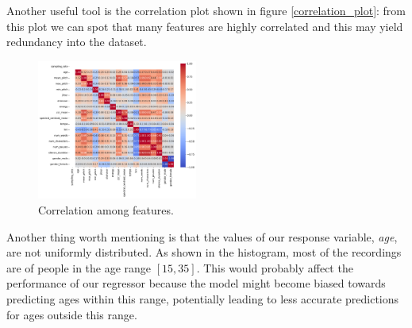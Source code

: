Another useful tool is the correlation plot shown in figure \eqref{correlation_plot}: from this plot we can spot that many features are highly correlated and this may yield redundancy into the dataset.
\begin{figure}
    \includegraphics[width = 0.47\textwidth]{img/correlation.pdf}
    \caption{Correlation among features.}
    \label{correlation_plot}
\end{figure}

Another thing worth mentioning is that the values of our response variable, \textit{age}, are not uniformly distributed. As shown in the histogram, most of the recordings are of people in the age range $[15,35]$. This would probably affect the performance of our regressor because the model might become biased towards predicting ages within this range, potentially leading to less accurate predictions for ages outside this range.